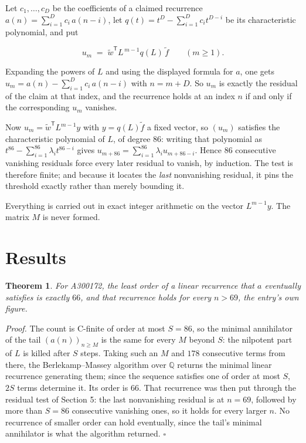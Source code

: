 \documentclass[11pt]{article}
\newtheorem{theorem}{Theorem}
\theoremstyle{definition}
\begin{document}
Let $c_1,\dots,c_D$ be the coefficients of a claimed recurrence $a(n) = \sum_{i=1}^{D} c_i\,a(n-i)$, let $q(t) = t^{D} - \sum_{i=1}^{D} c_i t^{D-i}$ be its characteristic polynomial, and put

\[u_m \;=\; \tilde w^{\mathsf T} L^{\,m-1} q(L)\,\tilde f \qquad (m \ge 1).\]

Expanding the powers of $L$ and using the displayed formula for $a$, one gets $u_m = a(n) - \sum_{i=1}^{D} c_i\,a(n-i)$ with $n = m + D$. So $u_m$ is exactly the residual of the claim at that index, and the recurrence holds at an index $n$ if and only if the corresponding $u_m$ vanishes.

Now $u_m = \tilde w^{\mathsf T} L^{m-1} y$ with $y = q(L)\tilde f$ a fixed vector, so $(u_m)$ satisfies the characteristic polynomial of $L$, of degree $86$: writing that polynomial as $t^{86} - \sum_{i=1}^{86} \lambda_i t^{86-i}$ gives $u_{m+86} = \sum_{i=1}^{86} \lambda_i u_{m+86-i}$. Hence $86$ consecutive vanishing residuals force every later residual to vanish, by induction. The test is therefore finite; and because it locates the {\itshape last} nonvanishing residual, it pins the threshold exactly rather than merely bounding it.

Everything is carried out in exact integer arithmetic on the vector $L^{m-1}y$. The matrix $M$ is never formed.

\section{Results}

\begin{theorem} For A300172, the least order of a linear recurrence that $a$ eventually satisfies is exactly $66$, and that recurrence holds for every $n > 69$, the entry's own figure.\end{theorem}

{\itshape Proof.} The count is C-finite of order at most $S = 86$, so the minimal annihilator of the tail $(a(n))_{n \ge M}$ is the same for every $M$ beyond $S$: the nilpotent part of $L$ is killed after $S$ steps. Taking such an $M$ and $178$ consecutive terms from there, the Berlekamp--Massey algorithm over $\mathbb{Q}$ returns the minimal linear recurrence generating them; since the sequence satisfies one of order at most $S$, $2S$ terms determine it. Its order is $66$. That recurrence was then put through the residual test of Section 5: the last nonvanishing residual is at $n = 69$, followed by more than $S = 86$ consecutive vanishing ones, so it holds for every larger $n$. No recurrence of smaller order can hold eventually, since the tail's minimal annihilator is what the algorithm returned. $\square$
\end{document}
